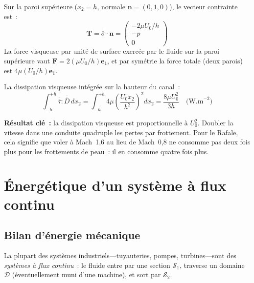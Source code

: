 \documentclass[11pt,a4paper]{report}
\newcommand{\ten}[1]{\overline{\overline{#1}}}   %
\begin{document}
Sur la paroi supérieure ($x_2=h$, normale $\bm{n}=(0,1,0)$), le vecteur contrainte est~:
\[
    \bm{T} = \ten{\sigma}\cdot\bm{n} = \begin{pmatrix} -2\mu U_0/h \\ -p \\ 0 \end{pmatrix}
\]
La force visqueuse par unité de surface exercée par le fluide sur la paroi supérieure
vaut $\bm{F}=2(\mu U_0/h)\bm{e}_1$, et par symétrie la force totale (deux parois) est
$4\mu(U_0/h)\bm{e}_1$.

La dissipation visqueuse intégrée sur la hauteur du canal~:
\[
    \int_{-h}^{+h}\ten{\tau}:\ten{D}\,dx_2
    = \int_{-h}^{+h}4\mu\left(\frac{U_0 x_2}{h^2}\right)^2 dx_2
    = \frac{8\mu U_0^2}{3h} \quad \text{(W.m}^{-2}\text{)}
\]

\textbf{Résultat clé~:} la dissipation visqueuse est proportionnelle à $U_0^2$.
Doubler la vitesse dans une conduite quadruple les pertes par frottement.
Pour le Rafale, cela signifie que voler à Mach~1{,}6 au lieu de Mach~0{,}8
ne consomme pas deux fois plus pour les frottements de peau~: il en consomme
quatre fois plus.

\section{Énergétique d'un système à flux continu}

\subsection{Bilan d'énergie mécanique}

La plupart des systèmes industriels---tuyauteries, pompes, turbines---sont des
\emph{systèmes à flux continu}~: le fluide entre par une section $\mathcal{S}_1$,
traverse un domaine $\mathcal{D}$ (éventuellement muni d'une machine), et sort
par $\mathcal{S}_2$.

\begin{center}
\end{center}
\end{document}
